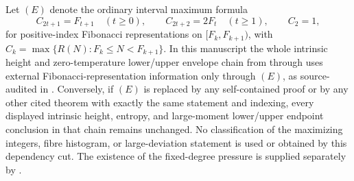 \begin{theorem}
\label{prop:intrinsic-height-source-dependency-cut}
\label{thm:intrinsic-height-source-dependency-cut}
\label{thm:intrinsic-height-dependency-cut}
Let \((E)\) denote the ordinary interval maximum formula
\[
  C_{2t+1}=F_{t+1}\quad(t\ge0),
  \qquad
  C_{2t+2}=2F_t\quad(t\ge1),
  \qquad C_2=1,
\]
for positive-index Fibonacci representations on \([F_k,F_{k+1})\), with
\(C_k=\max\{R(N):F_k\le N<F_{k+1}\}\).  In this manuscript the whole intrinsic
height and zero-temperature lower/upper envelope chain from
 through
uses external Fibonacci-representation information only through \((E)\), as
source-audited in .  Conversely,
if \((E)\) is replaced by any self-contained proof or by any other cited theorem
with exactly the same statement and indexing, every displayed intrinsic height,
entropy, and large-moment lower/upper endpoint conclusion in that chain remains
unchanged.
No classification of the maximizing integers, fibre histogram, or
large-deviation statement is used or obtained by this dependency cut.  The
existence of the fixed-degree pressure is supplied separately by
.
\end{theorem}

